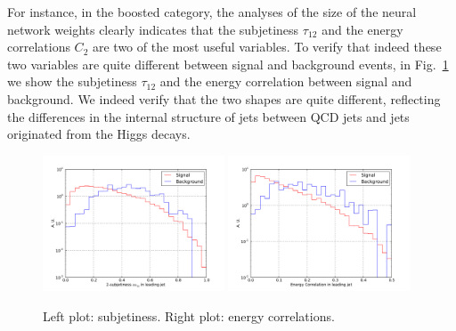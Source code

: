 For instance, in the boosted category, the analyses of the
size of the neural network weights clearly indicates that the subjetiness
$\tau_{12}$ and the energy correlations $C_2$ are two of the most useful
variables.
%
To verify that indeed these two variables are quite different between signal
and background events, in Fig.~\ref{fig:mva_substructure_1}
we show the subjetiness $\tau_{12}$ and the energy correlation between
signal and background.
%
We indeed verify that the two shapes are quite different,
reflecting the differences in the internal structure of jets
between QCD jets and jets originated from the Higgs decays.


\begin{figure}[t]
\begin{center}
  \includegraphics[width=0.48\textwidth]{plots/tau21_h0_res_C1_boost.pdf}
  \includegraphics[width=0.48\textwidth]{plots/EEC_C2_h0_res_C1_boost.pdf}
  \caption{\small Left plot: subjetiness.
    Right plot: energy correlations.
}
\label{fig:mva_substructure_1}
\end{center}
\end{figure}



